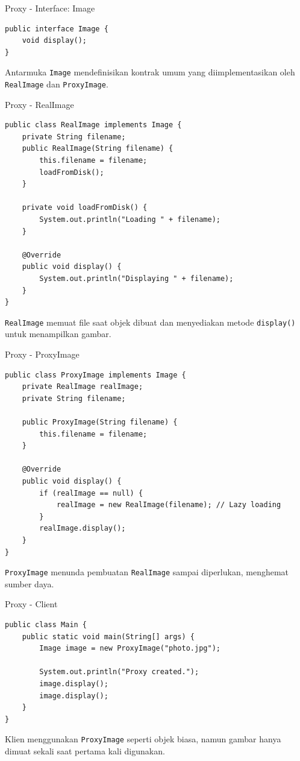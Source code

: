 \documentclass[aspectratio=169, table]{beamer}
\begin{document}
\begin{frame}[fragile]{Proxy - Interface: Image}
\vspace{20pt}
\begin{lstlisting}[style=JavaStyle]
public interface Image {
	void display();
}
\end{lstlisting}

\small Antarmuka \texttt{Image} mendefinisikan kontrak umum yang diimplementasikan oleh \texttt{RealImage} dan \texttt{ProxyImage}.
\end{frame}

\begin{frame}[fragile]{Proxy - RealImage}
\vspace{20pt}
\begin{lstlisting}[style=JavaStyle]
public class RealImage implements Image {
	private String filename;	
	public RealImage(String filename) {
		this.filename = filename;
		loadFromDisk();
	}
	
	private void loadFromDisk() {
		System.out.println("Loading " + filename);
	}
	
	@Override
	public void display() {
		System.out.println("Displaying " + filename);
	}
}
\end{lstlisting}

\small \texttt{RealImage} memuat file saat objek dibuat dan menyediakan metode \texttt{display()} untuk menampilkan gambar.
\end{frame}

\begin{frame}[fragile]{Proxy - ProxyImage}
\vspace{20pt}
\begin{lstlisting}[style=JavaStyle]
public class ProxyImage implements Image {
	private RealImage realImage;
	private String filename;
	
	public ProxyImage(String filename) {
		this.filename = filename;
	}
	
	@Override
	public void display() {
		if (realImage == null) {
			realImage = new RealImage(filename); // Lazy loading
		}
		realImage.display();
	}
}
\end{lstlisting}

\small \texttt{ProxyImage} menunda pembuatan \texttt{RealImage} sampai diperlukan, menghemat sumber daya.
\end{frame}

\begin{frame}[fragile]{Proxy - Client}
\vspace{20pt}
\begin{lstlisting}[style=JavaStyle]
public class Main {
	public static void main(String[] args) {
		Image image = new ProxyImage("photo.jpg");
		
		System.out.println("Proxy created.");
		image.display();
		image.display();
	}
}
\end{lstlisting}

\small Klien menggunakan \texttt{ProxyImage} seperti objek biasa, namun gambar hanya dimuat sekali saat pertama kali digunakan.
\end{frame}
\end{document}
